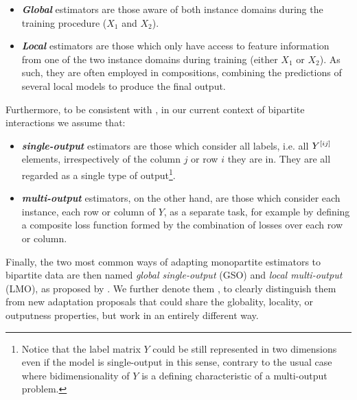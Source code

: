 \begin{itemize}
    \item \emph{\textbf{Global}} estimators are those aware of both instance domains during the training procedure ($X_1$ and $X_2$).
    \item \emph{\textbf{Local}} estimators are those which only have access to feature information from one of the two instance domains during training (either $X_1$ or $X_2$).
    As such, they are often employed in compositions, combining the predictions of several local models to produce the final output.
\end{itemize}

Furthermore, to be consistent with \citet{pliakos2018,pliakos2019,pliakos2020}, in our current context of bipartite interactions we assume that:

\begin{itemize}
    \item \emph{\textbf{single-output}} estimators are those which consider all labels, i.e. all $Y^{[ij]}$ elements, irrespectively of the column $j$ or row $i$ they are in. They are all regarded as a single type of output\footnote{Notice that the label matrix $Y$ could be still represented in two dimensions even if the model is single-output in this sense, contrary to the usual case where bidimensionality of $Y$ is a defining characteristic of a multi-output problem.}.
    \item \emph{\textbf{multi-output}} estimators, on the other hand, are those which consider each instance, each row or column of $Y$, as a separate task, for example by defining a composite loss function formed by the combination of losses over each row or column.
\end{itemize}

Finally, the two most common ways of adapting monopartite estimators to bipartite data are then named \emph{global single-output} (GSO) and \emph{local multi-output} (LMO), as proposed by \citet{pliakos2018,pliakos2019,pliakos2020}. We further denote them , to clearly distinguish them from new adaptation proposals that could share the globality, locality, or outputness properties, but work in an entirely different way.

